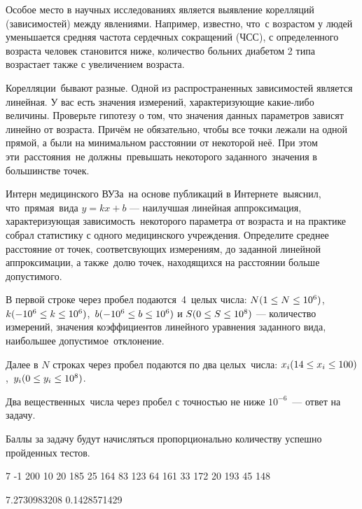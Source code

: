 
Особое место в научных исследованиях является выявление корелляций (зависимостей) между явлениями. Например, известно, что с возрастом у людей уменьшается средняя частота сердечных сокращений (ЧСС), с определенного возраста человек становится ниже, количество больних диабетом 2 типа возрастает также с увеличением возраста.

Корелляции бывают разные. Одной из распространенных зависимостей является линейная. У вас есть значения измерений, характеризующие какие-либо величины. Проверьте гипотезу о том, что значения данных параметров зависят линейно от возраста. Причём не обязательно, чтобы все точки лежали на одной прямой, а были на минимальном расстоянии от некоторой неё. При этом эти расстояния не должны превышать некоторого заданного значения в большинстве точек. 

Интерн медицинского ВУЗа на основе публикаций в Интернете выяснил, что прямая вида $y = kx + b$ — наилучшая линейная аппроксимация, характеризующая зависимость некоторого параметра от возраста и на практике собрал статистику с одного медицинского учреждения. Определите среднее расстояние от точек, соответсвующих измерениям, до заданной линейной аппроксимации, а также долю точек, находящихся на расстоянии больше допустимого.


В первой строке через пробел подаются 4 целых числа: $N\space (1\leq N\leq 10^6)$, $k\space (-10^6\leq k\leq 10^6)$, $b\space (-10^6\leq b\leq 10^6)$ и $S\space (0\leq S\leq 10^8)$ — количество измерений, значения коэффициентов линейного уравнения заданного вида, наибольшее допустимое отклонение.

Далее в $N$ строках через пробел подаются по два целых числа: $x_i\space (14\leq x_i\leq 100)$, $y_i\space (0\leq y_i\leq 10^8)$.

\outputfmtSection

Два вещественных числа через пробел с точностью не ниже $10^{-6}$ — ответ на задачу.

\markSection

Баллы за задачу будут начисляться пропорционально количеству успешно пройденных тестов.


\begin{myverbbox}[\small]{\vinput}
    7 -1 200 10
    20 185
    25 164
    83 123
    64 161
    33 172
    20 193
    45 148
\end{myverbbox}
\begin{myverbbox}[\small]{\voutput}
    7.2730983208 0.1428571429
\end{myverbbox}

